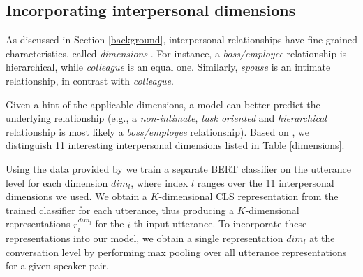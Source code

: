 \subsection{Incorporating interpersonal dimensions}

As discussed in Section \ref{background}, interpersonal relationships have fine-grained characteristics, called \textit{dimensions} \cite{wish1976perceived}. For instance, a \textit{boss/employee} relationship is hierarchical, while \textit{colleague} is an equal one. Similarly, \textit{spouse} is an intimate relationship, in contrast with \textit{colleague}.

Given a hint of the applicable dimensions, a model can better predict the underlying relationship (e.g., a \textit{non-intimate}, \textit{task oriented} and \textit{hierarchical} relationship is most likely a \textit{boss/employee} relationship). Based on \citet{rashid2018characterizing}, we distinguish 11 interesting interpersonal dimensions listed in Table \ref{dimensions}. 

Using the data provided by \citet{rashid2018characterizing} we train a separate BERT classifier on the utterance level for each dimension $dim_l$, where index $l$ ranges over the 11 interpersonal dimensions we used.
We obtain a $K$-dimensional CLS representation from the trained classifier for each utterance, thus producing a $K$-dimensional representations $r^{dim_l}_i$ for the $i$-th input utterance.
To incorporate these representations into our model, we obtain a single representation $dim_l$ at the conversation level by performing max pooling over all utterance representations for a given speaker pair.

